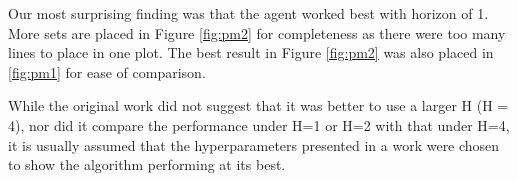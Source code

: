\documentclass{article}
\begin{document}
\begin{flushleft}
Our most surprising finding was that the agent worked best with horizon of 1.
More sets are placed in Figure \ref{fig:pm2} for completeness as there
were too many lines to place in one plot.
The best result in Figure \ref{fig:pm2} was also placed in \ref{fig:pm1}
for ease of comparison.

While the original work did not suggest that it was 
better to use a larger H (H = 4), nor did it
compare the performance under H=1 or H=2 with that under H=4, 
it is usually assumed
that the hyperparameters presented in a work
were chosen to show the algorithm performing at its best.





\def\pmavgs{
\avg{pm-32-1-d-avg.csv} \addlegendentry{D=32 H=1 decay=0.9995}
\avg{pm-32-1-e-avg.csv} \addlegendentry{D=32 H=1 E=0.1}
\avg{pm-32-1-o-avg.csv} \addlegendentry{D=32 H=1 E=0}
\avg{pm-32-1-avg.csv} \addlegendentry{D=32 H=1 E=0.05}
\avg{pm-64-1-avg.csv} \addlegendentry{D=64 H=1 E=0.05}
\avg{pm-96-1-avg.csv} \addlegendentry{D=96 H=1 E=0.05}
\avg{pm-96-4-d-avg.csv} \addlegendentry{D=96 H=1 D=0.99999}
\avg{pm-128-1-avg.csv} \addlegendentry{D=128 H=1 E=0.05}
\avg{pm-32-2-avg.csv} \addlegendentry{D=32 H=2 E=0.05}
\avg{pm-64-4-e-avg.csv} \addlegendentry{D=64 H=4 E=0.1}
\avg{pm-96-4-e-avg.csv} \addlegendentry{D=96 H=4 E=0.1}
}


\def \pmcvs {
\one{pm-32-1-d.csv} \addlegendentry{D=32 H=1 decay=0.9995}
\one{pm-32-1-e.csv} \addlegendentry{D=32 H=1 E=0.1}
\one{pm-32-1-o.csv} \addlegendentry{D=32 H=1 E=0}
\one{pm-32-1.csv} \addlegendentry{D=32 H=1 E=0.05}
\one{pm-64-1.csv} \addlegendentry{D=64 H=1 E=0.05}
\one{pm-96-1.csv} \addlegendentry{D=96 H=1 E=0.05}
\one{pm-128-1.csv} \addlegendentry{D=128 H=1 E=0.05}
\one{pm-32-2.csv} \addlegendentry{D=32 H=2 E=0.05}
\one{pm-64-4-e.csv} \addlegendentry{D=64 H=4 E=0.1}
\one{pm-96-4-e.csv} \addlegendentry{D=96 H=4 E=0.1}
\one{pm-48-1-e.csv} \addlegendentry{D=48 H=1 E=0.1 }
\one{pm-96-4-d.csv} \addlegendentry{D=96 H=1 D=0.99999}
}



\end{flushleft}
\end{document}
